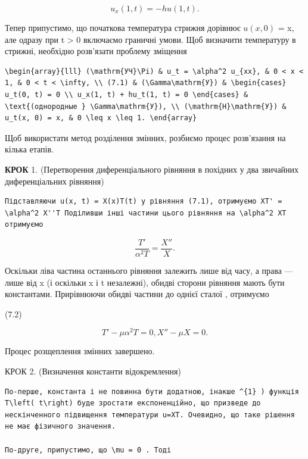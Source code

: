 \documentclass[
  ukrainian,
]{article}
\begin{document}
\[
u_x(1, t) = -hu(1, t).
\]

Тепер припустимо, що початкова температура стрижня дорівнює \(u(x, 0)\)
= x, але одразу при t \textgreater{} 0 включаємо граничні умови. Щоб
визначити температуру в стрижні, необхідно розв'язати проблему зміщення

\begin{verbatim}
\begin{array}{lll} (\mathrm{УЧ}\Pi) & u_t = \alpha^2 u_{xx}, & 0 < x < 1, & 0 < t < \infty, \\ (7.1) & (\Gamma\mathrm{У}) & \begin{cases} u_t(0, t) = 0 \\ u_x(1, t) + hu_t(1, t) = 0 \end{cases} & \text{(однородные } \Gamma\mathrm{У}), \\ (\mathrm{H}\mathrm{У}) & u_t(x, 0) = x, & 0 \leq x \leq 1. \end{array}
\end{verbatim}

Щоб використати метод розділення змінних, розбиємо процес розв'язання на
кілька етапів.

\textbf{КРОК} 1. (Перетворення диференціального рівняння в похідних у
два звичайних диференціальних рівняння)

\begin{verbatim}
Підставляючи u(x, t) = X(x)T(t) у рівняння (7.1), отримуємо XT' = \alpha^2 X''T Поділивши інші частини цього рівняння на \alpha^2 XT отримуємо
\end{verbatim}

\[
\frac{T'}{\alpha^2 T} = \frac{X''}{X} .
\]

Оскільки ліва частина останнього рівняння залежить лише від часу, а
права --- лише від x (і оскільки x і t незалежні), обидві сторони
рівняння мають бути константами. Прирівнюючи обидві частини до однієї
сталої \mu , отримуємо

(7.2)

\[
T' - \mu \alpha^{2} T = 0, X'' - \mu X = 0.
\]

Процес розщеплення змінних завершено.

КРОК 2. (Визначення константи відокремлення)

\begin{verbatim}
По-перше, константа і не повинна бути додатною, інакше ^{1} ) функція T\left( t\right) буде зростати експоненційно, що призведе до нескінченного підвищення температури u=XT. Очевидно, що таке рішення не має фізичного значення.

По-друге, припустимо, що \mu = 0 . Тоді
\end{verbatim}
\end{document}
